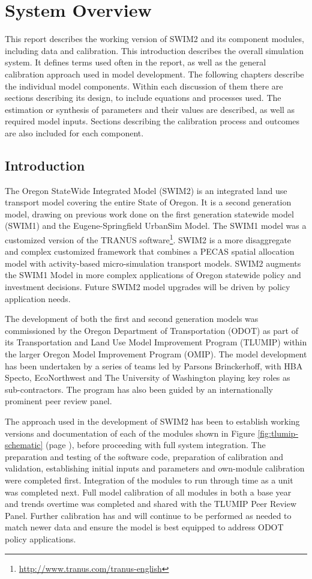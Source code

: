 \chapter{System Overview}\label{sec:system-overview}
This report describes the working version of SWIM2 and its component modules, including data and calibration. This introduction describes the overall simulation system. It defines terms used often in the report, as well as the general calibration approach used in model development. The following chapters describe the individual model components. Within each discussion of them there are sections describing its design, to include equations and processes used. The estimation or synthesis of parameters and their values are described, as well as required model inputs. Sections describing the calibration process and outcomes are also included for each component.  

\section{Introduction}
The Oregon StateWide Integrated Model (SWIM2) is an integrated land use transport model covering the entire State of Oregon. It is a second generation model, drawing on previous work done on the first generation statewide model (SWIM1) and the Eugene-Springfield UrbanSim Model. The SWIM1 model \citep{parsons99} was a customized version of the TRANUS software\footnote{\url{http://www.tranus.com/tranus-english}}. SWIM2 is a more disaggregate and complex customized framework that combines a PECAS spatial allocation model with activity-based micro-simulation transport models. SWIM2 augments the SWIM1 Model in more complex applications of Oregon statewide policy and investment decisions. Future SWIM2 model upgrades will be driven by policy application needs.

The development of both the first and second generation models was commissioned by the Oregon Department of Transportation (ODOT) as part of its Transportation and Land Use Model Improvement Program (TLUMIP) within the larger Oregon Model Improvement Program (OMIP). The model development has been undertaken by a series of teams led by Parsons Brinckerhoff, with HBA Specto, EcoNorthwest and The University of Washington playing key roles as sub-contractors. The program has also been guided by an internationally prominent peer review panel.

The approach used in the development of SWIM2 has been to establish working versions and documentation of each of the modules shown in Figure \ref{fig:tlumip-schematic} (page \pageref{fig:tlumip-schematic}), before proceeding with full system integration. The preparation and testing of the software code, preparation of calibration and validation, establishing initial inputs and parameters and own-module calibration were completed first. Integration of the modules to run through time as a unit was completed next. Full model calibration of all modules in both a base year and trends overtime was completed and shared with the TLUMIP Peer Review Panel. Further calibration has and will continue to be performed as needed to match newer data and ensure the model is best equipped to address ODOT policy applications. 

